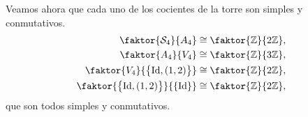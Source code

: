 \begin{example}
\begin{enumerate}[1.]
            \noindent Veamos ahora que cada uno de los cocientes de la torre son simples y conmutativos. 
            \begin{align*}
                \faktor{\Sim_4}{A_4} &\cong \faktor{\z}{2\z},\\
                \faktor{A_4}{V_4} &\cong \faktor{\z}{3\z},\\
                \faktor{V_4}{\lc \Id,\lp 1,2\rp\rc} &\cong \faktor{\z}{2\z},\\
                \faktor{\lc \Id,\lp 1,2\rp\rc}{\lc\Id\rc} &\cong \faktor{\z}{2\z},
            \end{align*}
            que son todos simples y conmutativos. 
    \end{enumerate}
\end{example}
